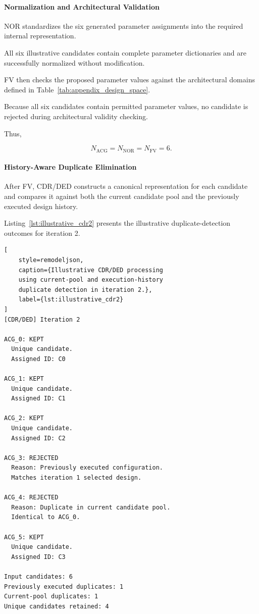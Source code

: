 \paragraph{Normalization and Architectural Validation}

NOR standardizes the six generated parameter
assignments into the required internal
representation.

All six illustrative candidates contain
complete parameter dictionaries and are
successfully normalized without modification.

FV then checks the proposed parameter values
against the architectural domains defined in
Table~\ref{tab:appendix_design_space}.

Because all six candidates contain permitted
parameter values, no candidate is rejected
during architectural validity checking.

Thus,

\begin{equation}
N_{\mathrm{ACG}}
=
N_{\mathrm{NOR}}
=
N_{\mathrm{FV}}
=
6.
\end{equation}

\paragraph{History-Aware Duplicate Elimination}

After FV, CDR/DED constructs a canonical
representation for each candidate and
compares it against both the current
candidate pool and the previously executed
design history.

Listing~\ref{lst:illustrative_cdr2}
presents the illustrative duplicate-detection
outcomes for iteration 2.

\begin{lstlisting}[
    style=remodeljson,
    caption={Illustrative CDR/DED processing
    using current-pool and execution-history
    duplicate detection in iteration 2.},
    label={lst:illustrative_cdr2}
]
[CDR/DED] Iteration 2

ACG_0: KEPT
  Unique candidate.
  Assigned ID: C0

ACG_1: KEPT
  Unique candidate.
  Assigned ID: C1

ACG_2: KEPT
  Unique candidate.
  Assigned ID: C2

ACG_3: REJECTED
  Reason: Previously executed configuration.
  Matches iteration 1 selected design.

ACG_4: REJECTED
  Reason: Duplicate in current candidate pool.
  Identical to ACG_0.

ACG_5: KEPT
  Unique candidate.
  Assigned ID: C3

Input candidates: 6
Previously executed duplicates: 1
Current-pool duplicates: 1
Unique candidates retained: 4
\end{lstlisting}

